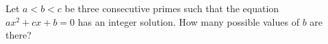 Let $a<b<c$ be three consecutive primes such that the equation $ax^2+cx+b=0$ has an integer solution. How many possible values of $b$ are there?
